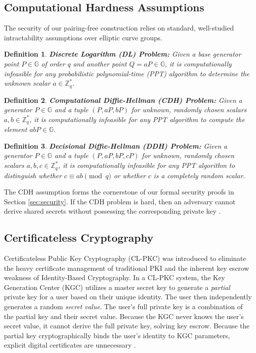 \documentclass[10pt,journal,compsoc]{IEEEtran}
\newtheorem{definition}{Definition}
\begin{document}
\subsection{Computational Hardness Assumptions}
The security of our pairing-free construction relies on standard, well-studied intractability assumptions over elliptic curve groups.

\begin{definition}
\textbf{Discrete Logarithm (DL) Problem:} Given a base generator point $P \in \mathbb{G}$ of order $q$ and another point $Q = aP \in \mathbb{G}$, it is computationally infeasible for any probabilistic polynomial-time (PPT) algorithm to determine the unknown scalar $a \in \mathbb{Z}_q^*$.
\end{definition}

\begin{definition}
\textbf{Computational Diffie-Hellman (CDH) Problem:} Given a generator $P \in \mathbb{G}$ and a tuple $(P, aP, bP)$ for unknown, randomly chosen scalars $a, b \in \mathbb{Z}_q^*$, it is computationally infeasible for any PPT algorithm to compute the element $abP \in \mathbb{G}$.
\end{definition}

\begin{definition}
\textbf{Decisional Diffie-Hellman (DDH) Problem:} Given a generator $P \in \mathbb{G}$ and a tuple $(P, aP, bP, cP)$ for unknown, randomly chosen scalars $a, b, c \in \mathbb{Z}_q^*$, it is computationally infeasible for any PPT algorithm to distinguish whether $c \equiv ab \pmod q$ or whether $c$ is a completely random scalar.
\end{definition}

The CDH assumption forms the cornerstone of our formal security proofs in Section \ref{sec:security}. If the CDH problem is hard, then an adversary cannot derive shared secrets without possessing the corresponding private key \cite{lu2023certificateless}.

\subsection{Certificateless Cryptography}
Certificateless Public Key Cryptography (CL-PKC) was introduced to eliminate the heavy certificate management of traditional PKI and the inherent key escrow weakness of Identity-Based Cryptography. In a CL-PKC system, the Key Generation Center (KGC) utilizes a master secret key to generate a \textit{partial} private key for a user based on their unique identity. The user then independently generates a random \textit{secret value}. The user's full private key is a combination of the partial key and their secret value. 
Because the KGC never knows the user's secret value, it cannot derive the full private key, solving key escrow. Because the partial key cryptographically binds the user's identity to KGC parameters, explicit digital certificates are unnecessary \cite{elhabob2020efficient}.
\end{document}

